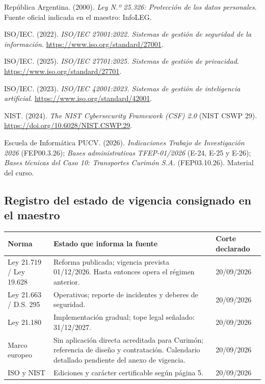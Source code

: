 \begin{enumerate}[label={[\arabic*]},leftmargin=2em,itemsep=4pt]
\item República Argentina. (2000). \textit{Ley N.º 25.326: Protección de los datos personales}. Fuente oficial indicada en el maestro: InfoLEG.
\item ISO/IEC. (2022). \textit{ISO/IEC 27001:2022. Sistemas de gestión de seguridad de la información}. \url{https://www.iso.org/standard/27001}.
\item ISO/IEC. (2025). \textit{ISO/IEC 27701:2025. Sistemas de gestión de privacidad}. \url{https://www.iso.org/standard/27701}.
\item ISO/IEC. (2023). \textit{ISO/IEC 42001:2023. Sistemas de gestión de inteligencia artificial}. \url{https://www.iso.org/standard/42001}.
\item NIST. (2024). \textit{The NIST Cybersecurity Framework (CSF) 2.0} (NIST CSWP 29). \url{https://doi.org/10.6028/NIST.CSWP.29}.
\item Escuela de Informática PUCV. (2026). \textit{Indicaciones Trabajo de Investigación 2026} (FEP00.3.26); \textit{Bases administrativas TFEP-01/2026} (E-24, E-25 y E-26); \textit{Bases técnicas del Caso 10: Transportes Curimón S.A.} (FEP03.10.26). Material del curso.
\end{enumerate}

\subsection{Registro del estado de vigencia consignado en el maestro}
\begin{tabularx}{\linewidth}{@{}p{3.6cm}Xp{2.8cm}@{}}
\toprule\textbf{Norma} & \textbf{Estado que informa la fuente} & \textbf{Corte declarado}\\\midrule
Ley 21.719 / Ley 19.628 & Reforma publicada; vigencia prevista 01/12/2026. Hasta entonces opera el régimen anterior. & 20/09/2026\\
Ley 21.663 / D.S. 295 & Operativos; reporte de incidentes y deberes de seguridad. & 20/09/2026\\
Ley 21.180 & Implementación gradual; tope legal señalado: 31/12/2027. & 20/09/2026\\
Marco europeo & Sin aplicación directa acreditada para Curimón; referencia de diseño y contratación. Calendario detallado pendiente del anexo de vigencia. & 20/09/2026\\
ISO y NIST & Ediciones y carácter certificable según página 5. & 20/09/2026\\\bottomrule
\end{tabularx}
